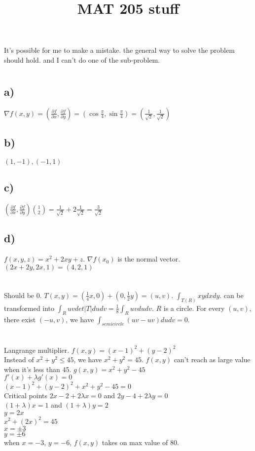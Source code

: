 \documentclass[letter]{article}
\title{MAT 205 stuff}
\date{}
\begin{document}
\maketitle
\vspace{-.5in}
It's possible for me to make a mistake. the general way to solve the problem
should hold. and I can't do one of the sub-problem.
\section{}

\subsection*{a)}
$\nabla f(x,y) = (\frac{\partial f}{\partial x},\frac{\partial f}{\partial y})=
(\cos \frac{\pi}{4}, \sin \frac{\pi}{4}) =
(\frac{1}{\sqrt{2}},\frac{1}{\sqrt{2}})$
\subsection*{b)}
$(1,-1),(-1,1)$
\subsection*{c)}
$(\frac{\partial f}{\partial x},\frac{\partial f}{\partial y}) {1 \choose 2} =
\frac{1}{\sqrt{2}}+2 \frac{1}{\sqrt{2}} = \frac{3}{\sqrt{2}}$
\subsection*{d)}
$f(x,y,z) = x^2+2xy+z$.
$\nabla f(x_0)$ is the normal vector.
$(2x+2y,2x,1) = (4,2,1)$

\section{}
Should be 0. $T(x,y) = (\frac{1}{4}x, 0) + (0, \frac{1}{2}y) =
(u,v)$. $\int_{T(R)} xy dx dy$. can be transformed into $ \int_R uv det|T| du dv
= \frac{1}{8} \int_R uv dudv $. $R$ is a circle. For every $(u,v)$, there exist
$(-u,v)$, we have $\int_{semicircle} (uv -uv) dudv= 0$.

\section{}
Langrange multiplier.
$f(x,y) = (x-1)^2+(y-2)^2$\\
Instead of $x^2 + y^2 \leq 45$, we have $x^2 + y^2 = 45$. $f(x,y)$ can't reach
as large value when it's less than 45. $g(x,y) = x^2+y^2-45$\\
$f'(x) + \lambda g'(x) = 0$\\
$(x-1)^2+(y-2)^2+x^2+y^2-45=0$\\
Critical points
$2x-2+2\lambda x =0$ and $2y-4 + 2\lambda y =0$\\
$(1+\lambda)x = 1$ and $(1+\lambda)y = 2$\\
$y=2x$\\
$x^2+(2x)^2=45$\\
$x = \pm 3$\\
$y = \pm 6$\\
when $x=-3$, $y=-6$, $f(x,y)$ takes on max value of 80.
\end{document}
